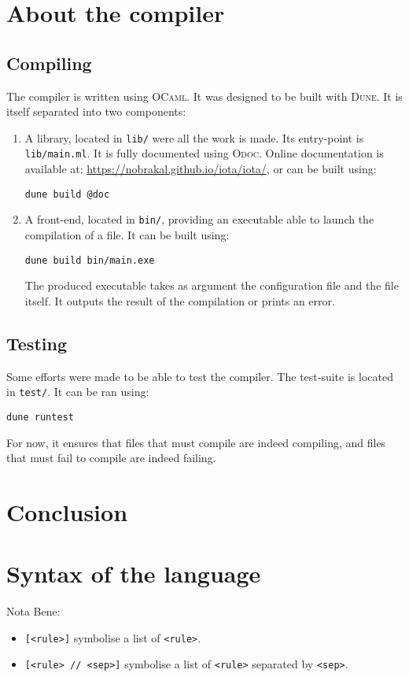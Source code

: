 \documentclass[10pt,a4paper]{article}
\newcommand\Odoc{\textsc{Odoc}}
\newcommand\Ocaml{\textsc{OCaml}}
\newcommand\Dune{\textsc{Dune}}
\begin{document}
\section{About the compiler}
\subsection{Compiling}
The compiler is written using \Ocaml{}\cite{ocaml}. It was designed to be built with \Dune{}\cite{dune}. It is itself separated into two components:

\begin{enumerate}
\item A library, located in \verb|lib/| were all the work is made. Its entry-point is \verb|lib/main.ml|. It is fully documented using \Odoc{}\cite{odoc}. Online documentation is available at: \url{https://nobrakal.github.io/iota/iota/}, or can be built using:
\begin{verbatim}
dune build @doc
\end{verbatim}
\item A front-end, located in \verb|bin/|, providing an executable able to launch the compilation of a file. It can be built using:
\begin{verbatim}
dune build bin/main.exe
\end{verbatim}
  The produced executable takes as argument the configuration file and the file itself. It outputs the result of the compilation or prints an error.
\end{enumerate}

\subsection{Testing}
Some efforts were made to be able to test the compiler. The test-suite is located in \verb|test/|. It can be ran using:
\begin{verbatim}
dune runtest
\end{verbatim}
For now, it ensures that files that must compile are indeed compiling, and files that must fail to compile are indeed failing.

\section{Conclusion}

\section{Syntax of the language}
Nota Bene:
\begin{itemize}
\item \verb|[<rule>]| symbolise a list of \verb|<rule>|.
\item \verb|[<rule> // <sep>]| symbolise a list of \verb|<rule>| separated by \verb|<sep>|.
\end{itemize}
\end{document}
